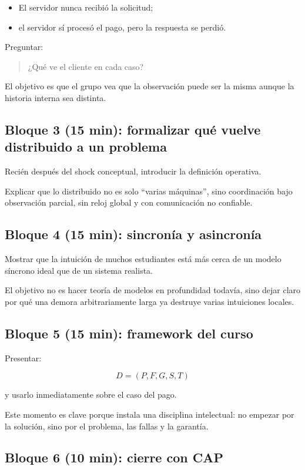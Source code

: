 \documentclass[variant=docente,cover=institutional,mode=screen]{ua-engineering-v6-article}
\begin{document}
\begin{itemize}
\item El servidor nunca recibió la solicitud;
\item el servidor sí procesó el pago, pero la respuesta se perdió.
\end{itemize}

Preguntar:

\begin{quote}
¿Qué ve el cliente en cada caso?
\end{quote}

El objetivo es que el grupo vea que la observación puede ser la misma aunque la historia interna sea distinta.

\subsection*{Bloque 3 (15 min): formalizar qué vuelve distribuido a un problema}

Recién después del shock conceptual, introducir la definición operativa.

Explicar que lo distribuido no es solo “varias máquinas”, sino coordinación bajo observación parcial, sin reloj global y con comunicación no confiable.

\subsection*{Bloque 4 (15 min): sincronía y asincronía}

Mostrar que la intuición de muchos estudiantes está más cerca de un modelo síncrono ideal que de un sistema realista.

El objetivo no es hacer teoría de modelos en profundidad todavía, sino dejar claro por qué una demora arbitrariamente larga ya destruye varias intuiciones locales.

\subsection*{Bloque 5 (15 min): framework del curso}

Presentar:

\[
D = (P, F, G, S, T)
\]

y usarlo inmediatamente sobre el caso del pago.

Este momento es clave porque instala una disciplina intelectual: no empezar por la solución, sino por el problema, las fallas y la garantía.

\subsection*{Bloque 6 (10 min): cierre con CAP}
\end{document}
